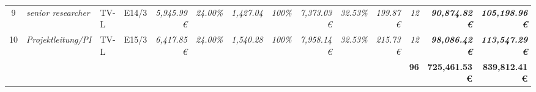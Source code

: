 \begin{table}[]
\begin{tabular}{clllcrrrrrrrrrr}
9                                                                                       & \multicolumn{2}{l}{\cellcolor[HTML]{FFFF99}\textit{senior researcher}}                & \cellcolor[HTML]{FFFF99}TV-L      & \cellcolor[HTML]{FFFF99}E14/3                & \cellcolor[HTML]{FFFF99}\textit{5,945.99 €}         & \textit{24.00\%}                                      & \textit{1,427.04}                            & \cellcolor[HTML]{FFFF99}\textit{100\%}                  & \cellcolor[HTML]{92D050}\textit{7,373.03 €}  & \cellcolor[HTML]{FFFF99}\textit{32.53\%}       & \cellcolor[HTML]{92D050}\textit{199.87 €}    & \cellcolor[HTML]{FFFF99}\textit{12}          & \cellcolor[HTML]{BFBFBF}\textit{\textbf{90,874.82 €}}           & \textit{\textbf{105,198.96 €}}                                                                \\
10                                                                                      & \multicolumn{2}{l}{\cellcolor[HTML]{FFFF99}\textit{Projektleitung/PI}}                & \cellcolor[HTML]{FFFF99}TV-L      & \cellcolor[HTML]{FFFF99}E15/3                & \cellcolor[HTML]{FFFF99}\textit{6,417.85 €}         & \textit{24.00\%}                                      & \textit{1,540.28}                            & \cellcolor[HTML]{FFFF99}\textit{100\%}                  & \cellcolor[HTML]{92D050}\textit{7,958.14 €}  & \cellcolor[HTML]{FFFF99}\textit{32.53\%}       & \cellcolor[HTML]{92D050}\textit{215.73 €}    & \cellcolor[HTML]{FFFF99}\textit{12}          & \cellcolor[HTML]{BFBFBF}\textit{\textbf{98,086.42 €}}           & \textit{\textbf{113,547.29 €}}                                                                \\
\rowcolor[HTML]{0070C0} 
\multicolumn{1}{l}{\cellcolor[HTML]{0070C0}{\color[HTML]{FFFFFF} \textbf{Gesamtsumme}}} &                                                         &                             &                                   & \multicolumn{1}{l}{\cellcolor[HTML]{0070C0}} & \multicolumn{1}{l}{\cellcolor[HTML]{0070C0}}        & \multicolumn{1}{l}{\cellcolor[HTML]{0070C0}}          & \multicolumn{1}{l}{\cellcolor[HTML]{0070C0}} & \multicolumn{1}{l}{\cellcolor[HTML]{0070C0}}            & \multicolumn{1}{l}{\cellcolor[HTML]{0070C0}} & \multicolumn{1}{l}{\cellcolor[HTML]{0070C0}}   & \multicolumn{1}{l}{\cellcolor[HTML]{0070C0}} & {\color[HTML]{FFFFFF} \textbf{96}}           & {\color[HTML]{FFFFFF} \textbf{725,461.53 €}}                    & {\color[HTML]{FFFFFF} \textbf{839,812.41 €}}                                                 
\end{tabular}
\end{table}

